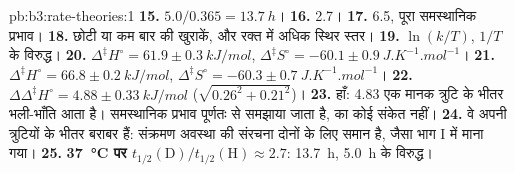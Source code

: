 \begin{solution}{pb:b3:rate-theories:1}
\textbf{15.} $5.0/0.365 = \qty{13.7}{h}$।
\textbf{16.} 2.7।
\textbf{17.} 6.5, पूरा समस्थानिक प्रभाव।
\textbf{18.} छोटी या कम बार की खुराकें, और रक्त में अधिक स्थिर स्तर।
\textbf{19.} $\ln(k/T)$, $1/T$ के विरुद्ध।
\textbf{20.} $\Delta^{\ddagger}H^\circ = 61.9 \pm \qty{0.3}{kJ/mol}$, $\Delta^{\ddagger}S^\circ = -60.1 \pm \qty{0.9}{J.K^{-1}.mol^{-1}}$।
\textbf{21.} $\Delta^{\ddagger}H^\circ = 66.8 \pm \qty{0.2}{kJ/mol}$, $\Delta^{\ddagger}S^\circ = -60.3 \pm \qty{0.7}{J.K^{-1}.mol^{-1}}$।
\textbf{22.} $\Delta\Delta^{\ddagger}H^\circ = 4.88 \pm \qty{0.33}{kJ/mol}$ ($\sqrt{0.26^2 + 0.21^2}$)।
\textbf{23.} हाँ: 4.83 एक मानक त्रुटि के भीतर भली-भाँति आता है। समस्थानिक प्रभाव
पूर्णतः  से समझाया जाता है,  का कोई संकेत नहीं।
\textbf{24.} वे अपनी त्रुटियों के भीतर बराबर हैं: संक्रमण अवस्था की संरचना
दोनों  के लिए समान है, जैसा भाग I में माना गया।
\textbf{25.} \textbf{\qty{37}{\celsius} पर $t_{1/2}(\mathrm D)/t_{1/2}(\mathrm H) \approx 2.7$}: \qty{13.7}{h}, \qty{5.0}{h} के विरुद्ध।
\end{solution}
